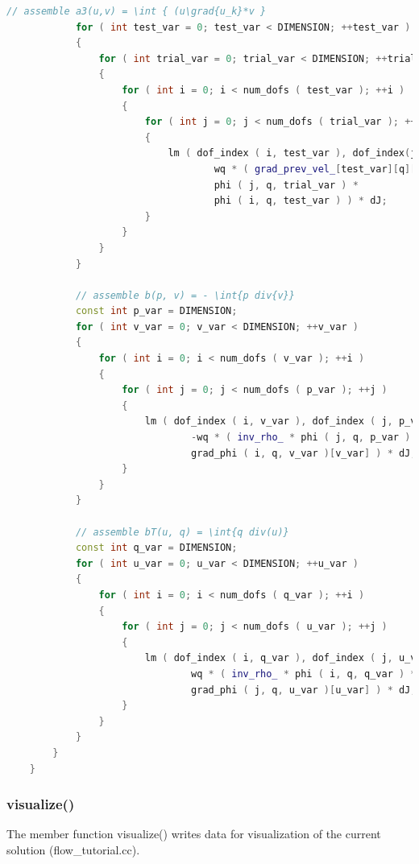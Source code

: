 \documentclass[a4paper, 11pt, twoside]{article}
\begin{document}
\begin{lstlisting}[language=C++, basicstyle={\footnotesize, \ttfamily}, keywordstyle=\color{blue},  numbers=none, tabsize=4]
            // assemble a3(u,v) = \int { (u\grad{u_k}*v }
            for ( int test_var = 0; test_var < DIMENSION; ++test_var )
            {
                for ( int trial_var = 0; trial_var < DIMENSION; ++trial_var )
                {
                    for ( int i = 0; i < num_dofs ( test_var ); ++i )
                    {
                        for ( int j = 0; j < num_dofs ( trial_var ); ++j )
                        {
                            lm ( dof_index ( i, test_var ), dof_index(j, trial_var)) +=
                                    wq * ( grad_prev_vel_[test_var][q][trial_var] *
                                    phi ( j, q, trial_var ) *
                                    phi ( i, q, test_var ) ) * dJ;
                        }
                    }
                }
            }

            // assemble b(p, v) = - \int{p div{v}}
            const int p_var = DIMENSION;
            for ( int v_var = 0; v_var < DIMENSION; ++v_var )
            {
                for ( int i = 0; i < num_dofs ( v_var ); ++i )
                {
                    for ( int j = 0; j < num_dofs ( p_var ); ++j )
                    {
                        lm ( dof_index ( i, v_var ), dof_index ( j, p_var ) ) +=
                                -wq * ( inv_rho_ * phi ( j, q, p_var ) *
                                grad_phi ( i, q, v_var )[v_var] ) * dJ;
                    }
                }
            }

            // assemble bT(u, q) = \int{q div(u)}
            const int q_var = DIMENSION;
            for ( int u_var = 0; u_var < DIMENSION; ++u_var )
            {
                for ( int i = 0; i < num_dofs ( q_var ); ++i )
                {
                    for ( int j = 0; j < num_dofs ( u_var ); ++j )
                    {
                        lm ( dof_index ( i, q_var ), dof_index ( j, u_var ) ) +=
                                wq * ( inv_rho_ * phi ( i, q, q_var ) *
                                grad_phi ( j, q, u_var )[u_var] ) * dJ;
                    }
                }
            }
        }
    }
\end{lstlisting}

\subsubsection{visualize()}\label{sec:visualize}
The member function visualize() writes data for visualization of the current solution (flow\_tutorial.cc).
\end{document}
